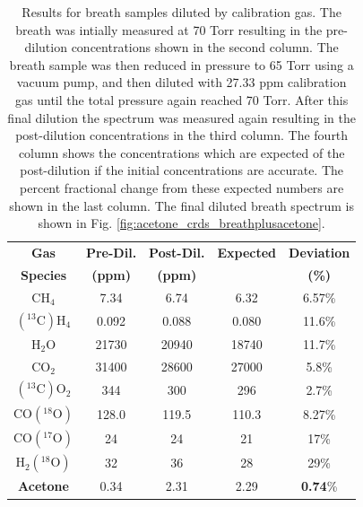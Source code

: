\documentclass[12pt]{report}
\begin{document}
	\begin{table}[H]
		\caption{Results for breath samples diluted by calibration gas. The breath was intially measured at 70 Torr resulting in the pre-dilution concentrations shown in the second column. The breath sample was then reduced in pressure to 65 Torr using a vacuum pump, and then diluted with 27.33 ppm calibration gas until the total pressure again reached 70 Torr. After this final dilution the spectrum was measured again resulting in the post-dilution concentrations in the third column. The fourth column shows the concentrations which are expected of the post-dilution if the initial concentrations are accurate. The percent fractional change from these expected numbers are shown in the last column. The final diluted breath spectrum is shown in Fig. \ref{fig:acetone_crds_breathplusacetone}.}
		\begin{center}
			\begin{tabular}{|c|c|c|c|c|}
				\hline
				\textbf{Gas} & \textbf{Pre-Dil.} & \textbf{Post-Dil.} & \textbf{Expected} & \textbf{Deviation} \\
				\textbf{Species} & \textbf{(ppm)} & \textbf{(ppm)} &  & \textbf{(\%)} \\
				\hline
				CH$_4$ 			       & 7.34 & 6.74 & 6.32 & 6.57\%\\ 
				\hline
				$\mathrm{(^{13}C)H_4}$ & 0.092 & 0.088 & 0.080 & 11.6\% \\ 
				\hline
				H$_2$O &                 21730 & 20940 & 18740 & 11.7\%\\
				\hline
				CO$_2$                 & 31400 & 28600 & 27000 & 5.8\%\\ 
				\hline
				$\mathrm{(^{13}C)O_2}$ & 344   & 300 & 296 & 2.7\%\\ 
				\hline
				$\mathrm{CO(^{18}O)}$  & 128.0 & 119.5 & 110.3 & 8.27\%\\ 
				\hline
				$\mathrm{CO(^{17}O)}$  & 24 & 24 & 21 & 17\%\\
				\hline
				$\mathrm{H_2(^{18}O)}$  & 32 & 36 & 28 & 29\%\\
				\hline
				\textbf{Acetone}       & 0.34 & 2.31 & 2.29 & \textbf{0.74}\%\\ 
				\hline
			\end{tabular}
		\end{center}
		\label{table:acetone_CRDS_concentrations}
	\end{table}
	
\end{document}
